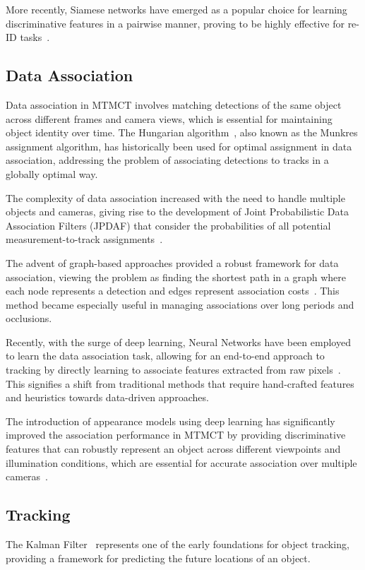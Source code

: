 More recently, Siamese networks have emerged as a popular choice for learning discriminative features in a pairwise manner, proving to be highly effective for re-ID tasks~\cite{Varior16}.

\subsection{Data Association}\label{subsec:milestone_data_association}
Data association in MTMCT involves matching detections of the same object across different frames and camera views, which is essential for maintaining object identity over time. The Hungarian algorithm~\cite{Kuhn55}, also known as the Munkres assignment algorithm, has historically been used for optimal assignment in data association, addressing the problem of associating detections to tracks in a globally optimal way.

The complexity of data association increased with the need to handle multiple objects and cameras, giving rise to the development of Joint Probabilistic Data Association Filters (JPDAF) that consider the probabilities of all potential measurement-to-track assignments~\cite{Fortmann83}.

The advent of graph-based approaches provided a robust framework for data association, viewing the problem as finding the shortest path in a graph where each node represents a detection and edges represent association costs~\cite{Zhang08}. This method became especially useful in managing associations over long periods and occlusions.

Recently, with the surge of deep learning, Neural Networks have been employed to learn the data association task, allowing for an end-to-end approach to tracking by directly learning to associate features extracted from raw pixels~\cite{Milan16b}. This signifies a shift from traditional methods that require hand-crafted features and heuristics towards data-driven approaches.

The introduction of appearance models using deep learning has significantly improved the association performance in MTMCT by providing discriminative features that can robustly represent an object across different viewpoints and illumination conditions, which are essential for accurate association over multiple cameras~\cite{Schroff15, Zheng16c}.

\subsection{Tracking}\label{subsec:milestone_tracking}
The Kalman Filter~\cite{Kalman60} represents one of the early foundations for object tracking, providing a framework for predicting the future locations of an object.

